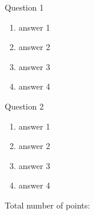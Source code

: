 \documentclass{beamer}
\newcounter{points}
\newenvironment{choices}{\begin{enumerate}}{\end{enumerate}}
\newenvironment{questions}{\setcounter{points}{0}}{}
\newcommand{\question}[1][1]{\addtocounter{points}{#1}}
\begin{document}
\begin{questions}

\question

\begin{frame}{Question 1}

\begin{choices}

\item answer 1

\item answer 2

\item answer 3

\item answer 4

\end{choices}
\end{frame}

\question[42]    
\begin{frame}{Question 2}

\begin{choices}

\item answer 1

\item answer 2

\item answer 3

\item answer 4

\end{choices}
\end{frame}

\end{questions}

\begin{frame}
Total number of points: \thepoints
\end{frame}
\end{document}
